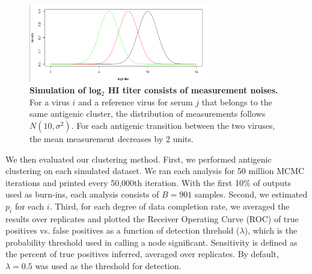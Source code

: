 \documentclass[11pt,oneside,letterpaper]{article}
\begin{document}
\begin{figure}[h]
	\centering		
	\includegraphics[width=0.7\textwidth]{figures/custom/simulationNoise}
	\caption{\textbf{Simulation of log$_2$ HI titer consists of measurement noises.} 
	 For a virus $i$ and a reference virus for serum $j$ that belongs to the same antigenic cluster, the distribution of measurements follows $N(10, \sigma^2)$. For each antigenic transition between the two viruses, the mean measurement decreases by 2 units.	
	 		} 
	\label{SimulationNoise} 
\end{figure}



We then evaluated our clustering method.
First, we performed antigenic clustering on each simulated dataset.
We ran each analysis for 50 million MCMC iterations and printed every 50,000th iteration.
With the first 10\% of outputs used as burn-ins, each analysis consists of $B=901$ samples.
Second, we estimated $p_i$ for each $i$.
Third, for each degree of data completion rate, we averaged the results over replicates and plotted the Receiver Operating Curve (ROC) of true positives vs. false positives as a function of detection threhold ($\lambda$), which is the probability threshold used in calling a node significant.
Sensitivity is defined as the percent of true positives inferred, averaged over replicates. By default, $\lambda=0.5$ was used as the threshold for detection.







\newpage




\end{document}
